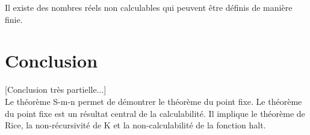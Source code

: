 \begin{myprop}
	Il existe des nombres réels non calculables qui peuvent être définis de
	manière finie.
\end{myprop}


\section{Conclusion}
[Conclusion très partielle...]\\
Le théorème S-m-n permet de démontrer le théorème du point fixe.
Le théorème du point fixe est un résultat central de la calculabilité. Il
implique le théorème de Rice, la non-récursivité de K et la non-calculabilité
de la fonction halt.


